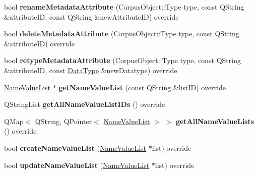 \begin{DoxyCompactItemize}
bool {\bfseries rename\+Metadata\+Attribute} (Corpus\+Object\+::\+Type type, const Q\+String \&attribute\+ID, const Q\+String \&new\+Attribute\+ID) override
\item 
\mbox{\label{class_s_q_l_metadata_datastore_af1c17b2155f1f77d58e8439967c2e123}} 
bool {\bfseries delete\+Metadata\+Attribute} (Corpus\+Object\+::\+Type type, const Q\+String \&attribute\+ID) override
\item 
\mbox{\label{class_s_q_l_metadata_datastore_ae4dc08348238fac17d6ec9c360622d40}} 
bool {\bfseries retype\+Metadata\+Attribute} (Corpus\+Object\+::\+Type type, const Q\+String \&attribute\+ID, const \hyperlink{class_data_type}{Data\+Type} \&new\+Datatype) override
\item 
\mbox{\label{class_s_q_l_metadata_datastore_a10abfaa28a086d0c6a26e7d404bb51c6}} 
\hyperlink{class_name_value_list}{Name\+Value\+List} $\ast$ {\bfseries get\+Name\+Value\+List} (const Q\+String \&list\+ID) override
\item 
\mbox{\label{class_s_q_l_metadata_datastore_a13decade306d5dd73adaae744667af36}} 
Q\+String\+List {\bfseries get\+All\+Name\+Value\+List\+I\+Ds} () override
\item 
\mbox{\label{class_s_q_l_metadata_datastore_aa875b35c7e7a0c4f811868666901e262}} 
Q\+Map$<$ Q\+String, Q\+Pointer$<$ \hyperlink{class_name_value_list}{Name\+Value\+List} $>$ $>$ {\bfseries get\+All\+Name\+Value\+Lists} () override
\item 
\mbox{\label{class_s_q_l_metadata_datastore_a035fc4df561a4a6c58a8994e8225cafa}} 
bool {\bfseries create\+Name\+Value\+List} (\hyperlink{class_name_value_list}{Name\+Value\+List} $\ast$list) override
\item 
\mbox{\label{class_s_q_l_metadata_datastore_a35966b635ae5be7c85bfb32264cbc23f}} 
bool {\bfseries update\+Name\+Value\+List} (\hyperlink{class_name_value_list}{Name\+Value\+List} $\ast$list) override
\item 
\mbox{\label{class_s_q_l_metadata_datastore_aadec2792dad0ece09f860ab67db83fef}} 

\end{DoxyCompactItemize}
